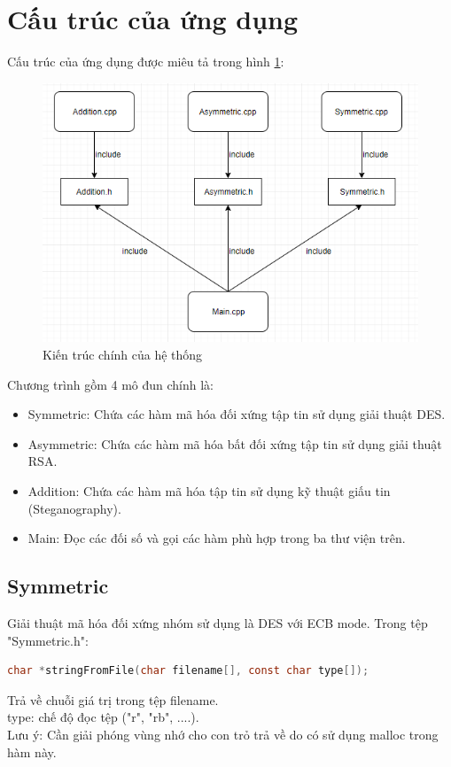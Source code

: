 \documentclass[a4paper]{article}
\begin{document}
\section{Cấu trúc của ứng dụng}
Cấu trúc của ứng dụng được miêu tả trong hình \ref{fig:file_structure}:
\begin{figure}[htp]
    \centering
    \includegraphics[scale=1]{file_structure.png}
    \caption{Kiến trúc chính của hệ thống}
    \label{fig:file_structure}
\end{figure}
Chương trình gồm 4 mô đun chính là:
\begin{itemize}
    \item Symmetric: Chứa các hàm mã hóa đối xứng tập tin sử dụng giải thuật DES.
    \item Asymmetric: Chứa các hàm mã hóa bất đối xứng tập tin sử dụng giải thuật RSA.
    \item Addition: Chứa các hàm mã hóa tập tin sử dụng kỹ thuật giấu tin (Steganography).
    \item Main: Đọc các đối số và gọi các hàm phù hợp trong ba thư viện trên.
\end{itemize}
	\subsection{Symmetric}
	Giải thuật mã hóa đối xứng nhóm sử dụng là DES với ECB mode. Trong tệp "Symmetric.h":\\
	\begin{lstlisting}[language=C]
char *stringFromFile(char filename[], const char type[]);
	\end{lstlisting}
	Trả về chuỗi giá trị trong tệp filename.\\
	type: chế độ đọc tệp ("r", "rb", ....).\\
	Lưu ý: Cần giải phóng vùng nhớ cho con trỏ trả về do có sử dụng malloc trong hàm này.\\
\end{document}
